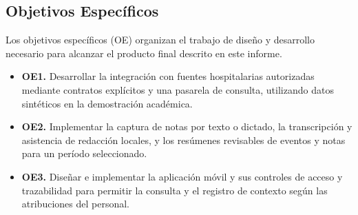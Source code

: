 \subsection{Objetivos Específicos}

Los objetivos específicos (OE) organizan el trabajo de diseño y desarrollo necesario para alcanzar el producto final descrito en este informe.

\begin{itemize}
    \item \textbf{OE1.} Desarrollar la integración con fuentes hospitalarias autorizadas mediante contratos explícitos y una pasarela de consulta, utilizando datos sintéticos en la demostración académica.

    \item \textbf{OE2.} Implementar la captura de notas por texto o dictado, la transcripción y asistencia de redacción locales, y los resúmenes revisables de eventos y notas para un período seleccionado.

    \item \textbf{OE3.} Diseñar e implementar la aplicación móvil y sus controles de acceso y trazabilidad para permitir la consulta y el registro de contexto según las atribuciones del personal.

\end{itemize}
